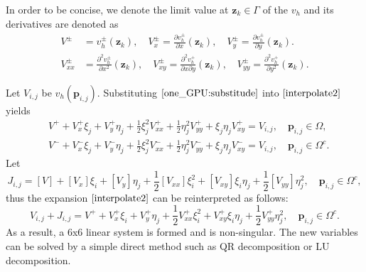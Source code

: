 \documentclass{article}
\begin{document}
In order to be concise, we denote the limit value at $\mathbf{z}_{k} \in \Gamma$ of the $v_{h}$ and its derivatives are denoted as
\begin{equation}
\begin{aligned}
    V^{\pm} & = v_{h}^{\pm}(\mathbf{z}_{k}), \quad V_{x}^{\pm} = \frac{\partial v_{h}^{\pm}}{\partial x}(\mathbf{z}_{k}), \quad V_{y}^{\pm} = \frac{\partial v_{h}^{\pm}}{\partial y}(\mathbf{z}_{k}). \\
    V_{xx}^{\pm} & = \frac{\partial^{2} v_{h}^{\pm}}{\partial x^{2}}(\mathbf{z}_{k}), \quad V_{xy}^{\pm} = \frac{\partial^{2} v_{h}^{+}}{\partial x\partial y}(\mathbf{z}_{k}), \quad V_{yy}^{\pm} = \frac{\partial^{2} v_{h}^{+}}{\partial y^{2}}(\mathbf{z}_{k}).
\end{aligned}\label{one_GPU:substitude}
\end{equation}

Let $V_{i,j}$ be $v_h({\mathbf{p}_{i,j}})$. Substituting $\eqref{one_GPU:substitude}$ into $\eqref{interpolate2}$ yields
\begin{equation}
\begin{aligned}
    & V^{+}+V_x^{+} \xi_j+V_y^{+} \eta_j+\frac{1}{2} \xi_j^2 V_{x x}^{+}+\frac{1}{2} \eta_j^2 V_{y y}^{+}+\xi_j \eta_j V_{x y}^{+}=V_{i,j}, \quad \mathbf{p}_{i,j} \in \Omega, \\
    & V^{-}+V_x^{-} \xi_j+V_y^{-} \eta_j+\frac{1}{2} \xi_j^2 V_{x x}^{-}+\frac{1}{2} \eta_j^2 V_{y y}^{-}+\xi_j \eta_j V_{x y}^{-}=V_{i,j}, 
    \quad \mathbf{p}_{i,j} \in \Omega^{c}.
\end{aligned}\label{one_GPU:substep}
\end{equation}
Let 
\begin{equation}
    J_{i,j} = [V] + [V_{x}]\xi_{i} + [V_{y}]\eta_{j} + \frac{1}{2}[V_{x x}]\xi_{i}^{2} + [V_{x y}] \xi_{i} \eta_{j} + \frac{1}{2}[V_{y y}]\eta_{j}^{2}, \quad \mathbf{p}_{i,j} \in \Omega^{c},
\end{equation}
thus the expansion $\eqref{interpolate2}$ can be reinterpreted as follows:
\begin{equation}
    V_{i,j}+ J_{i,j} =  V^{+} + V_{x}^{+}\xi_{i} + V_{y}^{+}\eta_{j}+ \frac{1}{2}V^{+}_{x x}\xi_{i}^{2} + 
    V_{x y}^{+}\xi_{i}\eta_{j} + \frac{1}{2}V^{+}_{y y}\eta_{j}^{2}, \quad \mathbf{p}_{i,j} \in \Omega^{c}.
\end{equation}
As a result, a 6x6 linear system is formed and is non-singular. The new variables can be solved by a simple direct method such as QR decomposition or LU decomposition.
\end{document}
